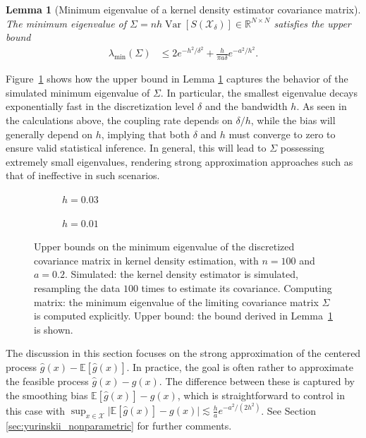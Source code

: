 \documentclass[11pt,lof]{puthesis}
\newcommand{\R}{\ensuremath{\mathbb{R}}}
\newcommand{\E}{\ensuremath{\mathbb{E}}}
\newcommand{\cX}{\ensuremath{\mathcal{X}}}
\DeclareMathOperator{\Var}{Var}
\theoremstyle{break}
\newtheorem{lemma}{Lemma}[section]
\theoremstyle{proof}
\begin{document}
\begin{lemma}[Minimum eigenvalue of a
  kernel density estimator covariance matrix]%
  \label{lem:yurinskii_kde_eigenvalue}
  The minimum eigenvalue of
  $\Sigma=n h\Var[S(\cX_\delta)] \in \R^{N \times N}$
  satisfies the upper bound
  \begin{align*}
    \lambda_{\min}(\Sigma)
    &\leq
    2 e^{-h^2/\delta^2}
    + \frac{h}{\pi a \delta}
    e^{-a^2 / h^2}.
  \end{align*}
\end{lemma}
%
Figure~\ref{fig:yurinskii_min_eig} shows how the upper bound in Lemma
\ref{lem:yurinskii_kde_eigenvalue} captures the behavior of the simulated
minimum
eigenvalue of $\Sigma$. In particular, the smallest eigenvalue decays
exponentially fast in the discretization level $\delta$ and the bandwidth $h$.
As seen in the calculations above, the coupling rate depends on $\delta / h$,
while the bias will generally depend on $h$, implying that both $\delta$ and
$h$ must converge to zero to ensure valid statistical inference. In general,
this will lead to $\Sigma$ possessing extremely small eigenvalues, rendering
strong approximation approaches such as that of \citet{li2020uniform}
ineffective in such scenarios.
%
\begin{figure}[t]
  \centering
  \begin{subfigure}{0.49\textwidth}
    \centering
    \caption{$h = 0.03$}
  \end{subfigure}
  \begin{subfigure}{0.49\textwidth}
    \centering
    \caption{$h = 0.01$}
  \end{subfigure}
  \caption[Minimum eigenvalue of the kernel density covariance matrix]{
    Upper bounds on the minimum eigenvalue of the discretized covariance
    matrix in kernel density estimation,
    with $n=100$ and $a = 0.2$.
    Simulated: the kernel density estimator is simulated,
    resampling the data $100$ times
    to estimate its covariance.
    Computing matrix: the minimum eigenvalue of the limiting covariance
    matrix $\Sigma$ is computed explicitly.
    Upper bound: the bound derived in
    Lemma~\ref{lem:yurinskii_kde_eigenvalue}
    is shown.
  }
  \label{fig:yurinskii_min_eig}
\end{figure}

The discussion in this section focuses on the strong approximation of the
centered process $\hat g(x)-\E [ \hat g(x) ]$. In practice, the goal is often
rather to approximate the feasible process $\hat g(x)- g(x)$. The difference
between these is captured by the smoothing bias $\E [ \hat g(x) ] - g(x)$,
which is straightforward to control in this case with
$\sup_{x \in \cX} \big| \E [ \hat g(x) ] - g(x) \big|
\lesssim \frac{h}{a} e^{-a^2 / (2 h^2)}$.
See Section \ref{sec:yurinskii_nonparametric} for further
comments.
\end{document}
